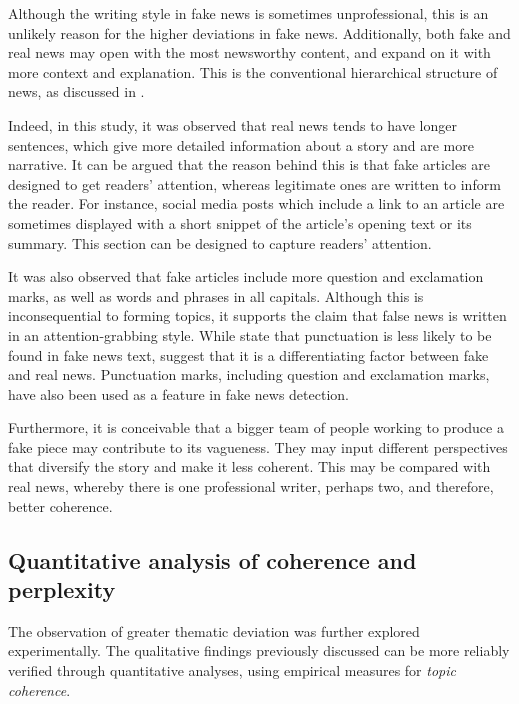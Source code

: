 Although the writing style in fake news is sometimes unprofessional, this is an unlikely reason for the higher deviations in fake news. Additionally, both fake and real news may open with the most newsworthy content, and expand on it with more context and explanation. This is the conventional hierarchical structure of news, as discussed in .

Indeed, in this study, it was observed that real news tends to have longer sentences, which give more detailed information about a story and are more narrative. It can be argued that the reason behind this is that fake articles are designed to get readers’ attention, whereas legitimate ones are written to inform the reader. For instance, social media posts which include a link to an article are sometimes displayed with a short snippet of the article’s opening text or its summary. This section can be designed to capture readers’ attention.

It was also observed that fake articles include more question and exclamation marks, as well as words and phrases in all capitals. Although this is inconsequential to forming topics, it supports the claim that false news is written in an attention-grabbing style. While  state that punctuation is less likely to be found in fake news text,  suggest that it is a differentiating factor between fake and real news. Punctuation marks, including question and exclamation marks, have also been used as a feature in fake news detection.

Furthermore, it is conceivable that a bigger team of people working to produce a fake piece may contribute to its vagueness. They may input different perspectives that diversify the story and make it less coherent. This may be compared with real news, whereby there is one professional writer, perhaps two, and therefore, better coherence.

\subsection{Quantitative analysis of coherence and perplexity}
\label{ssec:4-coherence-perplexity}

The observation of greater thematic deviation was further explored experimentally. The qualitative findings previously discussed can be more reliably verified through quantitative analyses, using empirical measures for \emph{topic coherence}.


